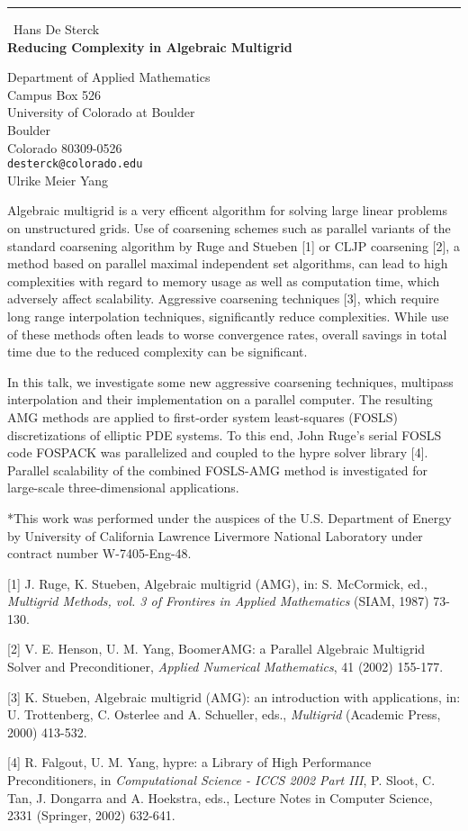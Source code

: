 \documentclass{report}
\begin{document}
\begin{center}
\rule{6in}{1pt} \
{\large Hans De Sterck \\
{\bf Reducing Complexity in Algebraic Multigrid}}

Department of Applied Mathematics \\ Campus Box 526 \\ University of Colorado at Boulder \\ Boulder \\ Colorado 80309-0526
\\
{\tt desterck@colorado.edu}\\
Ulrike Meier Yang\end{center}

Algebraic multigrid is a very efficent algorithm for
solving large linear problems on unstructured grids.
Use of coarsening schemes such as parallel variants of the
standard coarsening algorithm by Ruge and Stueben [1] or CLJP coarsening
[2], a method based on parallel maximal independent set algorithms, can
lead to high complexities with regard to memory usage as well as
computation time, which adversely affect scalability.
Aggressive coarsening techniques [3], which require long range
interpolation techniques, significantly reduce complexities. While use of
these methods often leads to worse convergence rates, overall savings in
total time due to the reduced complexity can be significant.

In this talk, we investigate some new aggressive coarsening techniques,
multipass interpolation and their implementation on a parallel computer.
The resulting AMG methods are applied to first-order system least-squares
(FOSLS) discretizations of elliptic PDE systems. To this end, John Ruge's
serial FOSLS code FOSPACK was parallelized and coupled to the hypre
solver library [4]. Parallel scalability of the combined FOSLS-AMG method
is
investigated for large-scale three-dimensional applications.

\vspace{0.25in}

*This work was performed under the auspices of the U.S. Department of
Energy by University of California Lawrence Livermore National Laboratory
under contract number W-7405-Eng-48.

\vspace{0.5in}

[1] J. Ruge, K. Stueben, Algebraic multigrid (AMG), in: S. McCormick,
ed., {\em Multigrid Methods, vol. 3 of Frontires in Applied Mathematics}
(SIAM, 1987) 73-130.

[2] V. E. Henson, U. M. Yang, BoomerAMG: a Parallel Algebraic Multigrid
Solver and Preconditioner, {\em Applied Numerical Mathematics}, 41 (2002)
155-177.

[3] K. Stueben, Algebraic multigrid (AMG): an introduction with
applications, in: U. Trottenberg, C. Osterlee and A. Schueller, eds.,
{\em Multigrid} (Academic Press, 2000) 413-532.

[4] R. Falgout, U. M. Yang, hypre: a Library of High Performance
Preconditioners, in {\em Computational Science - ICCS 2002 Part III}, P.
Sloot, C. Tan, J. Dongarra and A. Hoekstra, eds., Lecture Notes in
Computer Science, 2331 (Springer, 2002) 632-641.
\end{document}
